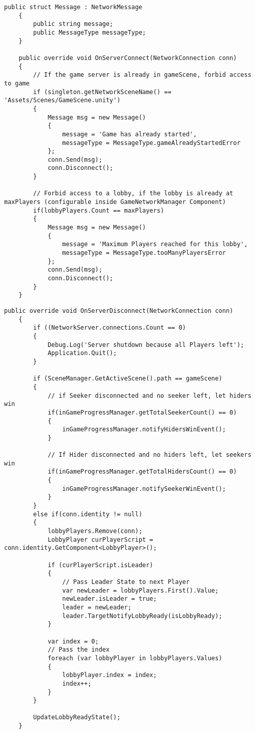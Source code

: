 \begin{lstlisting}[caption= GameNetworkManager.cs OnServerConnect() und Message struct]
	public struct Message : NetworkMessage
	{
		public string message;
		public MessageType messageType;
	}
	
	public override void OnServerConnect(NetworkConnection conn)
	{
		// If the game server is already in gameScene, forbid access to game
		if (singleton.getNetworkSceneName() == 'Assets/Scenes/GameScene.unity')
		{
			Message msg = new Message()
			{
				message = 'Game has already started',
				messageType = MessageType.gameAlreadyStartedError
			};
			conn.Send(msg);
			conn.Disconnect();
		}
		
		// Forbid access to a lobby, if the lobby is already at maxPlayers (configurable inside GameNetworkManager Component)
		if(lobbyPlayers.Count == maxPlayers)
		{
			Message msg = new Message()
			{
				message = 'Maximum Players reached for this lobby',
				messageType = MessageType.tooManyPlayersError
			};
			conn.Send(msg);
			conn.Disconnect();
		}
	}
\end{lstlisting}

\begin{lstlisting}[caption= GameNetworkManager.cs OnServerDisconnect()]
	public override void OnServerDisconnect(NetworkConnection conn)
	{
		if ((NetworkServer.connections.Count == 0)
		{
			Debug.Log('Server shutdown because all Players left');
			Application.Quit();
		}
		
		if (SceneManager.GetActiveScene().path == gameScene)
		{
			// if Seeker disconnected and no seeker left, let hiders win
			if(inGameProgressManager.getTotalSeekerCount() == 0)
			{
				inGameProgressManager.notifyHidersWinEvent();
			}
			
			// If Hider disconnected and no hiders left, let seekers win
			if(inGameProgressManager.getTotalHidersCount() == 0)
			{
				inGameProgressManager.notifySeekerWinEvent();
			}
		}
		else if(conn.identity != null)
		{
			lobbyPlayers.Remove(conn);
			LobbyPlayer curPlayerScript = conn.identity.GetComponent<LobbyPlayer>();
			
			if (curPlayerScript.isLeader)
			{
				// Pass Leader State to next Player
				var newLeader = lobbyPlayers.First().Value;
				newLeader.isLeader = true;
				leader = newLeader;
				leader.TargetNotifyLobbyReady(isLobbyReady);
			}
			
			var index = 0;
			// Pass the index
			foreach (var lobbyPlayer in lobbyPlayers.Values)
			{
				lobbyPlayer.index = index;
				index++;
			}
		}
		
		UpdateLobbyReadyState();
	}
\end{lstlisting}

